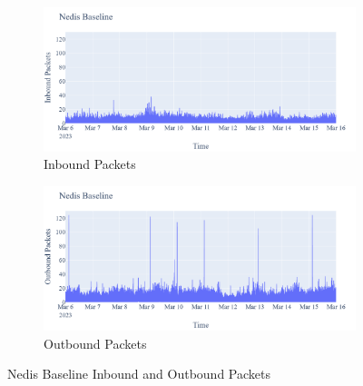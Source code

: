  \begin{figure}[H]
    \centering
    \begin{subfigure}[b]{0.7\textwidth}
        \includegraphics[width=\textwidth]{figures/Nedis_Baseline_InboundPackets.png}
        \caption{Inbound Packets}
        \label{fig:NedisBaselineInboundPackets}
    \end{subfigure}
    \begin{subfigure}[b]{0.7\textwidth}
        \includegraphics[width=\textwidth]{figures/Nedis_Baseline_OutboundPackets.png}
        \caption{Outbound Packets}
        \label{fig:NedisBaselineOutboundPackets}
    \end{subfigure}
    \caption{Nedis Baseline Inbound and Outbound Packets}
    \label{Fig:NedisBaselineOutandInboundPackets}
 \end{figure}
 
